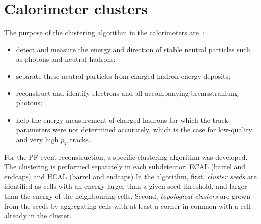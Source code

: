 \section{Calorimeter clusters}
The purpose of the clustering algorithm in the calorimeters are~\cite{Sirunyan:2017ulk}:
\begin{itemize} 
\item detect and measure the energy and direction of stable neutral particles such as photons and neutral hadrons;
\item separate these neutral particles from charged hadron energy deposits;
\item reconstruct and identify electrons and all accompanying bremsstrahlung photons;
\item help the energy measurement of charged hadrons for which the track parameters were not determined accurately,
which is the case for low-quality and very high $p_T$ tracks.
\end{itemize}
For the PF event reconstruction, a  specific clustering algorithm was developed. 
The clustering is performed separately in each subdetector: ECAL (barrel and endcaps) and HCAL (barrel and endcaps)
In the algorithm, first, \textit{cluster seeds} are identified   as cells with an energy larger than a given seed threshold, and
larger than the energy of the neighbouring cells. Second, \textit{topological clusters} are grown from the seeds by aggregating cells with at least a corner in common with a cell already in the cluster.

